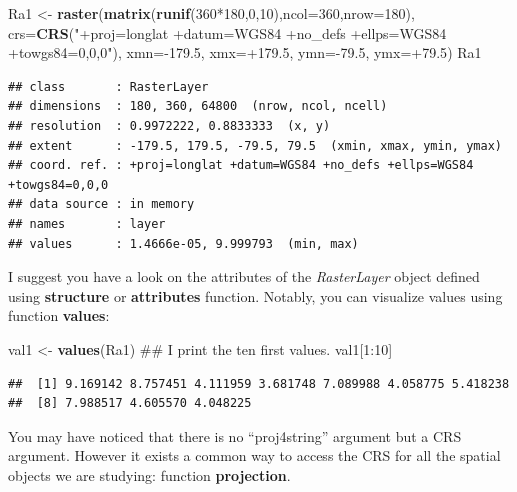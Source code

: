\documentclass[]{report}
\newenvironment{Shaded}{\begin{snugshade}}{\end{snugshade}}
\newcommand{\KeywordTok}[1]{\textcolor[rgb]{0.13,0.29,0.53}{\textbf{{#1}}}}
\newcommand{\DataTypeTok}[1]{\textcolor[rgb]{0.13,0.29,0.53}{{#1}}}
\newcommand{\DecValTok}[1]{\textcolor[rgb]{0.00,0.00,0.81}{{#1}}}
\newcommand{\FloatTok}[1]{\textcolor[rgb]{0.00,0.00,0.81}{{#1}}}
\newcommand{\StringTok}[1]{\textcolor[rgb]{0.31,0.60,0.02}{{#1}}}
\newcommand{\NormalTok}[1]{{#1}}
\begin{document}
\begin{Shaded}
\begin{Highlighting}[]
\NormalTok{Ra1 <-}\StringTok{ }\KeywordTok{raster}\NormalTok{(}\KeywordTok{matrix}\NormalTok{(}\KeywordTok{runif}\NormalTok{(}\DecValTok{360}\NormalTok{*}\DecValTok{180}\NormalTok{,}\DecValTok{0}\NormalTok{,}\DecValTok{10}\NormalTok{),}\DataTypeTok{ncol=}\DecValTok{360}\NormalTok{,}\DataTypeTok{nrow=}\DecValTok{180}\NormalTok{),}
    \DataTypeTok{crs=}\KeywordTok{CRS}\NormalTok{(}\StringTok{"+proj=longlat +datum=WGS84 +no_defs +ellps=WGS84 +towgs84=0,0,0"}\NormalTok{),}
    \DataTypeTok{xmn=}\NormalTok{-}\FloatTok{179.5}\NormalTok{, }\DataTypeTok{xmx=}\NormalTok{+}\FloatTok{179.5}\NormalTok{, }\DataTypeTok{ymn=}\NormalTok{-}\FloatTok{79.5}\NormalTok{, }\DataTypeTok{ymx=}\NormalTok{+}\FloatTok{79.5}\NormalTok{)}
\NormalTok{Ra1}
\end{Highlighting}
\end{Shaded}

\begin{verbatim}
## class       : RasterLayer 
## dimensions  : 180, 360, 64800  (nrow, ncol, ncell)
## resolution  : 0.9972222, 0.8833333  (x, y)
## extent      : -179.5, 179.5, -79.5, 79.5  (xmin, xmax, ymin, ymax)
## coord. ref. : +proj=longlat +datum=WGS84 +no_defs +ellps=WGS84 +towgs84=0,0,0 
## data source : in memory
## names       : layer 
## values      : 1.4666e-05, 9.999793  (min, max)
\end{verbatim}

I suggest you have a look on the attributes of the \emph{RasterLayer}
object defined using \textbf{structure} or \textbf{attributes} function.
Notably, you can visualize values using function \textbf{values}:

\begin{Shaded}
\begin{Highlighting}[]
\NormalTok{val1 <-}\StringTok{ }\KeywordTok{values}\NormalTok{(Ra1)}
\NormalTok{## I print the ten first values.}
\NormalTok{val1[}\DecValTok{1}\NormalTok{:}\DecValTok{10}\NormalTok{]}
\end{Highlighting}
\end{Shaded}

\begin{verbatim}
##  [1] 9.169142 8.757451 4.111959 3.681748 7.089988 4.058775 5.418238
##  [8] 7.988517 4.605570 4.048225
\end{verbatim}

You may have noticed that there is no ``proj4string'' argument but a CRS
argument. However it exists a common way to access the CRS for all the
spatial objects we are studying: function \textbf{projection}.
\end{document}
